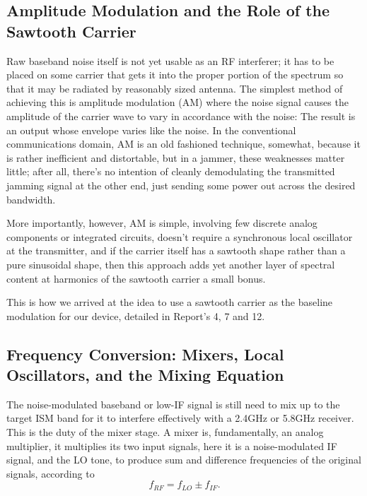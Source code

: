 \documentclass[12pt,a4paper]{report}
\begin{document}
	\subsection{Amplitude Modulation and the Role of the Sawtooth Carrier}
	Raw baseband noise itself is not yet usable as an RF interferer; it has to be placed on some carrier that gets it into the proper portion of the spectrum so that it may be radiated by reasonably sized antenna. The simplest method of achieving this is amplitude modulation (AM) where the noise signal causes the amplitude of the carrier wave to vary in accordance with the noise: The result is an output whose envelope varies like the noise. In the conventional communications domain, AM is an old fashioned technique, somewhat, because it is rather inefficient and distortable, but in a jammer, these weaknesses matter little; after all, there's no intention of cleanly demodulating the transmitted jamming signal at the other end, just sending some power out across the desired bandwidth. 
	
	\vspace{0.5cm}
	
	More importantly, however, AM is simple, involving few discrete analog components or integrated circuits, doesn't require a synchronous local oscillator at the transmitter, and if the carrier itself has a sawtooth shape rather than a pure sinusoidal shape, then this approach adds yet another layer of spectral content at harmonics of the sawtooth carrier a small bonus. 
	
	\vspace{0.5cm}
	
	This is how we arrived at the idea to use a sawtooth carrier as the baseline modulation for our device, detailed in Report's 4, 7 and 12.
	\subsection{Frequency Conversion: Mixers, Local Oscillators, and the Mixing Equation}
	
	The noise-modulated baseband or low-IF signal is still need to mix up to the target ISM band for it to interfere effectively with a 2.4GHz or 5.8GHz receiver. This is the duty of the mixer stage. A mixer is, fundamentally, an analog multiplier, it multiplies its two input signals, here it is a noise-modulated IF signal, and the LO tone, to produce sum and difference frequencies of the original signals, according to
	\[
	f_{RF} = f_{LO} \pm f_{IF}.
	\]
	
\end{document}
